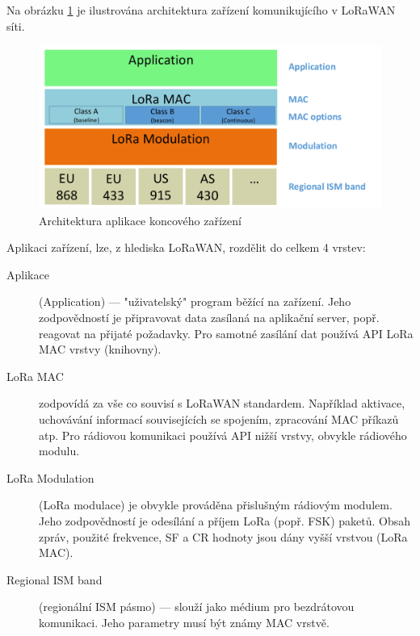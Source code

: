     Na obrázku \ref{fig:LoRaWAN_nodeswarch} je ilustrována architektura zařízení 
    komunikujícího v LoRaWAN síti.

    \begin{figure}[h]
        \begin{centering}
            \includegraphics[width=1\textwidth]{Figures/node_architecture}        
            \caption{Architektura aplikace koncového zařízení}
            \label{fig:LoRaWAN_nodeswarch}
        \end{centering}
    \end{figure}

    Aplikaci zařízení, lze, z hlediska LoRaWAN, rozdělit do celkem 4 vrstev:

    \begin{description}
        \item [Aplikace] (Application) --- "uživatelský" program běžící na zařízení. Jeho
            zodpovědností je připravovat data zasílaná na aplikační server,
            popř. reagovat na přijaté požadavky. Pro samotné zasílání dat používá
            API LoRa MAC vrstvy (knihovny).
        \item [LoRa MAC] zodpovídá za vše co souvisí s LoRaWAN standardem. 
            Například aktivace, uchovávání informací souvisejících se spojením,
            zpracování MAC příkazů atp. Pro rádiovou komunikaci používá API
            nižší vrstvy, obvykle rádiového modulu. 
        \item [LoRa Modulation] (LoRa modulace) je obvykle prováděna přislušným
            rádiovým modulem. Jeho zodpovědností je odesílání a příjem LoRa 
            (popř. FSK) paketů. Obsah zpráv, použité frekvence, SF a CR hodnoty
            jsou dány vyšší vrstvou (LoRa MAC).
        \item [Regional ISM band] (regionální ISM pásmo) --- slouží jako médium
            pro bezdrátovou komunikaci. Jeho parametry musí být známy MAC vrstvě.
    \end{description}

